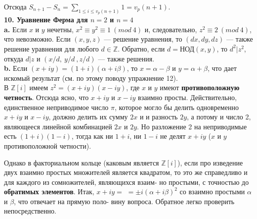 \documentclass{mai_book}
\begin{document}
Отсюда $S_{n+1}-S_n=\sum_{1\leqslant i\leqslant v_p(n+1)}1=v_p(n+1)$.\newline
\\
\noindent\textbf{10. Уравнение Ферма для $n=2$ и $n=4$} \newline 
\\
\hspace*{15pt}\textbf{a.} Если $x$ и $y$ нечетны,\:\: $x^2\equiv y^2\equiv 1~(mod~4)$\:\: и, следовательно,\linebreak
$z^2\equiv 2~(mod~4)$, что невозможно. Если $(x,y,z)$ — решение уравнения,\linebreak
то $(dx,dy,dz)$ — также решение уравнения для любого $d\in \mathbb{Z}$. Обратно,\linebreak
если $d=\text{НОД}(x,y)$, то $d^2|z^2$, откуда $d|z$ и $(x/d,~y/d~,z/d)$ — также\linebreak
решения.\newline
\\
\hspace*{15pt}\textbf{b.} Если $(x+iy)=(1+i)(\alpha+i\beta)$, то $x=\alpha-\beta$ и $y=\alpha+\beta$, что дает\linebreak
искомый результат (см. по этому поводу упражнение 12).\\

В $\mathbb{Z}[i]$ имеем $z^2=(x+iy)(x-iy)$, где $x$ и $y$ имеют \textbf{противоположную}\linebreak
\textbf{четность}. Отсюда ясно, что $x+iy$ и $x-iy$ взаимно просты.\linebreak
Действительно, единственное неприводимое число $\pi$, которое мог­ло бы\linebreak
делить одновременно $x+iy$ и $x-iy$, должно делить их сумму $2x$ и\linebreak
%
%
\noindent и разность $2y$, а потому и число 2, являющееся линейной комбинацией\linebreak
$2x$ и $2y$. Но разложение 2 на неприводимые есть $(1+i)(1-i)$, тогда как\linebreak 
ни $1+i$, ни $1-i$ не делят $x+iy$ ($x$ и $y$ противоположной четности).

Однако в факториальном кольце (каковым является $\mathbb{Z}[i]$), если про\linebreak
изведение двух взаимно простых множителей является квадратом, то\linebreak
это же справедливо и для каждого из сомножителей, являющихся взаим-\linebreak
но простыми, с точностью до \textbf{обратимых элементов}. Итак, $x+iy=$\linebreak
$=\pm i(\alpha+i\beta)^2$ со взаимно простыми $\alpha$ и $\beta$, что отвечает на прямую поло-\linebreak
вину вопроса. Обратное легко проверить непосредственно.
\end{document}
